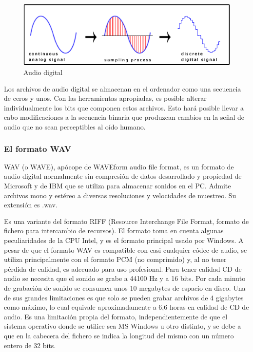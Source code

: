 \documentclass[12pt]{article}
\begin{document}
\begin{figure}[h]
  \centering
    \includegraphics[width=\textwidth]{img/digitalaudio}
  \caption{Audio digital}
  \label{audiodigital}
\end{figure}

Los archivos de audio digital se almacenan en el ordenador como una secuencia de ceros y unos. Con las herramientas apropiadas, es posible alterar individualmente los bits que componen estos archivos. Esto hará posible llevar a cabo modificaciones a la secuencia binaria que produzcan cambios en la señal de audio que no sean perceptibles al oído humano.

\subsubsection{El formato WAV}

WAV (o WAVE), apócope de WAVEform audio file format, es un formato de audio digital normalmente sin compresión de datos desarrollado y propiedad de Microsoft y de IBM que se utiliza para almacenar sonidos en el PC. Admite archivos mono y estéreo a diversas resoluciones y velocidades de muestreo. Su extensión es .wav.

Es una variante del formato RIFF (Resource Interchange File Format, formato de fichero para intercambio de recursos). El formato toma en cuenta algunas peculiaridades de la CPU Intel, y es el formato principal usado por Windows.
A pesar de que el formato WAV es compatible con casi cualquier códec de audio, se utiliza principalmente con el formato PCM (no comprimido) y, al no tener pérdida de calidad, es adecuado para uso profesional. Para tener calidad CD de audio se necesita que el sonido se grabe a 44100 Hz y a 16 bits. Por cada minuto de grabación de sonido se consumen unos 10 megabytes de espacio en disco. Una de sus grandes limitaciones es que solo se pueden grabar archivos de 4 gigabytes como máximo, lo cual equivale aproximadamente a 6,6 horas en calidad de CD de audio. Es una limitación propia del formato, independientemente de que el sistema operativo donde se utilice sea MS Windows u otro distinto, y se debe a que en la cabecera del fichero se indica la longitud del mismo con un número entero de 32 bits.
\end{document}
